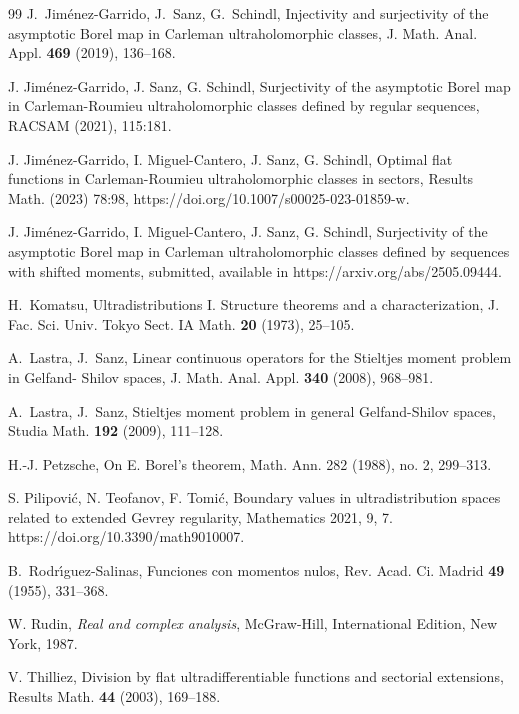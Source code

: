 \documentclass[12pt,a4paper]{article}
\theoremstyle{plain}
\theoremstyle{definition}
\numberwithin{equation}{section}
\begin{document}
\begin{thebibliography}{99}
J.~Jim\'enez-Garrido, J.~Sanz, G.~Schindl, Injectivity and surjectivity of the asymptotic Borel map in Carleman ultraholomorphic classes, J. Math. Anal. Appl. \textbf{469} (2019), 136--168.

  J. Jim\'enez-Garrido, J. Sanz, G. Schindl, Surjectivity of the asymptotic Borel map in Carleman-Roumieu ultraholomorphic classes defined by regular sequences, RACSAM (2021), 115:181.

 J. Jim\'enez-Garrido, I. Miguel-Cantero, J. Sanz, G. Schindl, Optimal flat functions in Carleman-Roumieu ultraholomorphic classes in sectors, Results Math. (2023) 78:98, https://doi.org/10.1007/s00025-023-01859-w.

 J. Jim\'enez-Garrido, I. Miguel-Cantero, J. Sanz, G. Schindl, Surjectivity of the asymptotic Borel map in Carleman ultraholomorphic classes defined by sequences with shifted moments, submitted, available in https://arxiv.org/abs/2505.09444.

 H.~Komatsu, Ultradistributions I. Structure theorems and a characterization, J. Fac. Sci. Univ. Tokyo Sect. IA Math.  {\bf{20}} (1973), 25--105.

 A.~Lastra, J.~Sanz, Linear continuous operators for the Stieltjes moment problem in Gelfand-
Shilov spaces, J. Math. Anal. Appl.  {\bf{340}} (2008), 968--981.

 A.~Lastra, J.~Sanz, Stieltjes moment problem in general Gelfand-Shilov spaces, Studia Math.
 {\bf{192}} (2009), 111--128.

 H.-J. Petzsche, On E. Borel's theorem, Math. Ann. 282 (1988), no. 2, 299--313.

 S. Pilipovi\'c, N. Teofanov, F. Tomi\'c, Boundary values in ultradistribution spaces related to extended Gevrey regularity, Mathematics 2021, 9, 7. https://doi.org/10.3390/math9010007.

B.~Rodr{\'\i}guez-Salinas, Funciones con momentos nulos, Rev. Acad. Ci. Madrid  {\bf{49}} (1955), 331--368.

 W. Rudin, \emph{Real and complex analysis}, McGraw-Hill, International Edition, New York, 1987.

 V. Thilliez, Division by flat ultradifferentiable functions and sectorial extensions, Results Math. \textbf{44} (2003), 169--188.
\end{thebibliography}
\newpage
\end{document}
